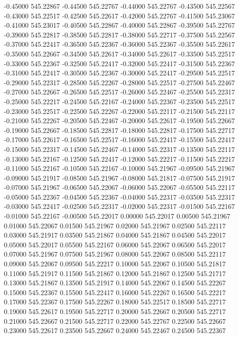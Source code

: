{-0.45000 545.22867
-0.44500 545.22767
-0.44000 545.22767
-0.43500 545.22567
-0.43000 545.22517
-0.42500 545.22617
-0.42000 545.22767
-0.41500 545.23067
-0.41000 545.23017
-0.40500 545.22867
-0.40000 545.22867
-0.39500 545.22767
-0.39000 545.22817
-0.38500 545.22817
-0.38000 545.22717
-0.37500 545.22567
-0.37000 545.22417
-0.36500 545.22367
-0.36000 545.22367
-0.35500 545.22617
-0.35000 545.22667
-0.34500 545.22617
-0.34000 545.22617
-0.33500 545.22517
-0.33000 545.22367
-0.32500 545.22417
-0.32000 545.22417
-0.31500 545.22367
-0.31000 545.22417
-0.30500 545.22367
-0.30000 545.22417
-0.29500 545.22517
-0.29000 545.22317
-0.28500 545.22267
-0.28000 545.22517
-0.27500 545.22467
-0.27000 545.22667
-0.26500 545.22517
-0.26000 545.22467
-0.25500 545.22317
-0.25000 545.22217
-0.24500 545.22167
-0.24000 545.22367
-0.23500 545.22517
-0.23000 545.22517
-0.22500 545.22267
-0.22000 545.22117
-0.21500 545.22117
-0.21000 545.22267
-0.20500 545.22467
-0.20000 545.22617
-0.19500 545.22667
-0.19000 545.22667
-0.18500 545.22817
-0.18000 545.22817
-0.17500 545.22717
-0.17000 545.22617
-0.16500 545.22517
-0.16000 545.22417
-0.15500 545.22417
-0.15000 545.22317
-0.14500 545.22467
-0.14000 545.22317
-0.13500 545.22117
-0.13000 545.22167
-0.12500 545.22417
-0.12000 545.22217
-0.11500 545.22217
-0.11000 545.22167
-0.10500 545.22167
-0.10000 545.21967
-0.09500 545.21967
-0.09000 545.21917
-0.08500 545.21967
-0.08000 545.21817
-0.07500 545.21917
-0.07000 545.21967
-0.06500 545.22067
-0.06000 545.22067
-0.05500 545.22117
-0.05000 545.22367
-0.04500 545.22367
-0.04000 545.22317
-0.03500 545.22317
-0.03000 545.22417
-0.02500 545.22317
-0.02000 545.22317
-0.01500 545.22167
-0.01000 545.22167
-0.00500 545.22017
0.00000 545.22017
0.00500 545.21967
0.01000 545.22067
0.01500 545.21967
0.02000 545.21967
0.02500 545.22117
0.03000 545.21917
0.03500 545.21867
0.04000 545.21867
0.04500 545.22017
0.05000 545.22017
0.05500 545.22167
0.06000 545.22067
0.06500 545.22017
0.07000 545.21967
0.07500 545.21967
0.08000 545.22067
0.08500 545.22117
0.09000 545.22067
0.09500 545.22217
0.10000 545.22067
0.10500 545.21817
0.11000 545.21917
0.11500 545.21867
0.12000 545.21867
0.12500 545.21717
0.13000 545.21867
0.13500 545.21917
0.14000 545.22067
0.14500 545.22267
0.15000 545.22367
0.15500 545.22417
0.16000 545.22267
0.16500 545.22217
0.17000 545.22367
0.17500 545.22267
0.18000 545.22517
0.18500 545.22717
0.19000 545.22617
0.19500 545.22717
0.20000 545.22667
0.20500 545.22717
0.21000 545.22667
0.21500 545.22717
0.22000 545.22767
0.22500 545.22667
0.23000 545.22617
0.23500 545.22667
0.24000 545.22467
0.24500 545.22367
}

